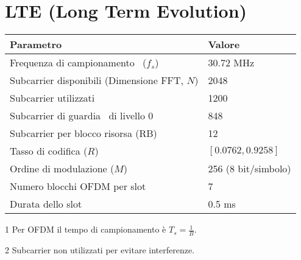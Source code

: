 \section*{LTE (Long Term Evolution)}

\begin{center}
    \begin{threeparttable}
        \begin{tabular}{|l|l|} 
            \hline
            \textbf{Parametro} & \textbf{Valore} \\
            \hline
             Frequenza di campionamento\tnote{1 } \  ($f_s$) & 30.72 MHz \\
            \hline
            Subcarrier disponibili (Dimensione FFT, $N$) & 2048 \\
            \hline
            Subcarrier utilizzati & 1200 \\
            \hline
            Subcarrier di guardia\tnote{2} \ di livello 0 & 848 \\
            \hline
            Subcarrier per blocco risorsa (RB) & 12 \\
            \hline
            Tasso di codifica ($R$) & $[0.0762, 0.9258]$ \\
            \hline
            Ordine di modulazione ($M$) & 256 (8 bit/simbolo) \\
            \hline
            Numero blocchi OFDM per slot & 7 \\
            \hline
            Durata dello slot & 0.5 ms \\
            \hline
        \end{tabular}
        \begin{tablenotes}
            \item[1] Per OFDM il tempo di campionamento è $T_s = \frac{1}{B}$.
            \item[2] Subcarrier non utilizzati per evitare interferenze.
        \end{tablenotes}
    \end{threeparttable}
\end{center}

